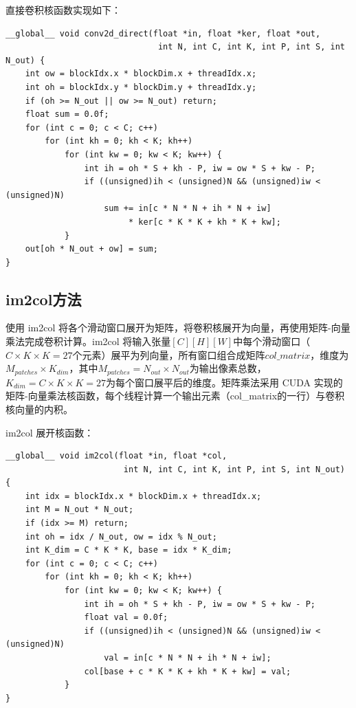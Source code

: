 \documentclass{SYSUReport}
\begin{document}
直接卷积核函数实现如下：
\begin{lstlisting}[style=cuda_cpp, caption={直接卷积核函数}]
__global__ void conv2d_direct(float *in, float *ker, float *out,
                               int N, int C, int K, int P, int S, int N_out) {
    int ow = blockIdx.x * blockDim.x + threadIdx.x;
    int oh = blockIdx.y * blockDim.y + threadIdx.y;
    if (oh >= N_out || ow >= N_out) return;
    float sum = 0.0f;
    for (int c = 0; c < C; c++)
        for (int kh = 0; kh < K; kh++)
            for (int kw = 0; kw < K; kw++) {
                int ih = oh * S + kh - P, iw = ow * S + kw - P;
                if ((unsigned)ih < (unsigned)N && (unsigned)iw < (unsigned)N)
                    sum += in[c * N * N + ih * N + iw]
                         * ker[c * K * K + kh * K + kw];
            }
    out[oh * N_out + ow] = sum;
}
\end{lstlisting}

\subsection{im2col方法}
使用 im2col 将各个滑动窗口展开为矩阵，将卷积核展开为向量，再使用矩阵-向量乘法完成卷积计算。im2col 将输入张量$[C][H][W]$中每个滑动窗口（$C\times K\times K = 27$个元素）展平为列向量，所有窗口组合成矩阵$col\_matrix$，维度为$M_{patches}\times K_{dim}$，其中$M_{patches}=N_{out}\times N_{out}$为输出像素总数，$K_{dim}=C\times K\times K=27$为每个窗口展平后的维度。矩阵乘法采用 CUDA 实现的矩阵-向量乘法核函数，每个线程计算一个输出元素（col\_matrix的一行）与卷积核向量的内积。

im2col 展开核函数：
\begin{lstlisting}[style=cuda_cpp, caption={im2col核函数}]
__global__ void im2col(float *in, float *col,
                        int N, int C, int K, int P, int S, int N_out) {
    int idx = blockIdx.x * blockDim.x + threadIdx.x;
    int M = N_out * N_out;
    if (idx >= M) return;
    int oh = idx / N_out, ow = idx % N_out;
    int K_dim = C * K * K, base = idx * K_dim;
    for (int c = 0; c < C; c++)
        for (int kh = 0; kh < K; kh++)
            for (int kw = 0; kw < K; kw++) {
                int ih = oh * S + kh - P, iw = ow * S + kw - P;
                float val = 0.0f;
                if ((unsigned)ih < (unsigned)N && (unsigned)iw < (unsigned)N)
                    val = in[c * N * N + ih * N + iw];
                col[base + c * K * K + kh * K + kw] = val;
            }
}
\end{lstlisting}
\end{document}
